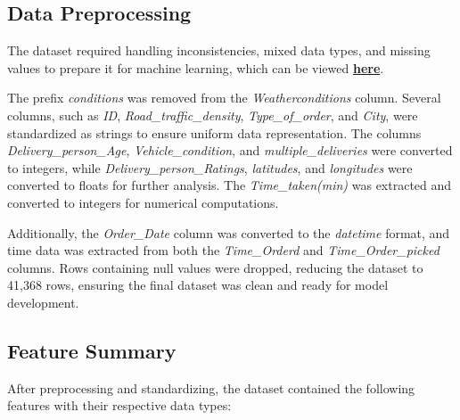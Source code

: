 \documentclass[10pt,twocolumn,letterpaper]{article}
\begin{document}
    \subsection{Data Preprocessing}
        The dataset required handling inconsistencies, mixed data types, and missing values to prepare it for machine learning, which can be viewed \href{https://github.com/Vikranth3140/Food-Delivery-Time-Prediction/blob/main/Data%20Pre%20Processing/pre-processing.py}{\textbf{here}}.

        The prefix \textit{conditions} was removed from the \textit{Weatherconditions} column. Several columns, such as \textit{ID}, \textit{Road\_traffic\_density}, \textit{Type\_of\_order}, and \textit{City}, were standardized as strings to ensure uniform data representation. The columns \textit{Delivery\_person\_Age}, \textit{Vehicle\_condition}, and \textit{multiple\_deliveries} were converted to integers, while \textit{Delivery\_person\_Ratings}, \textit{latitudes}, and \textit{longitudes} were converted to floats for further analysis. The \textit{Time\_taken(min)} was extracted and converted to integers for numerical computations.

        Additionally, the \textit{Order\_Date} column was converted to the \textit{datetime} format, and time data was extracted from both the \textit{Time\_Orderd} and \textit{Time\_Order\_picked} columns. Rows containing null values were dropped, reducing the dataset to 41,368 rows, ensuring the final dataset was clean and ready for model development.

        \subsection{Feature Summary}
        After preprocessing and standardizing, the dataset contained the following features with their respective data types:
\end{document}
